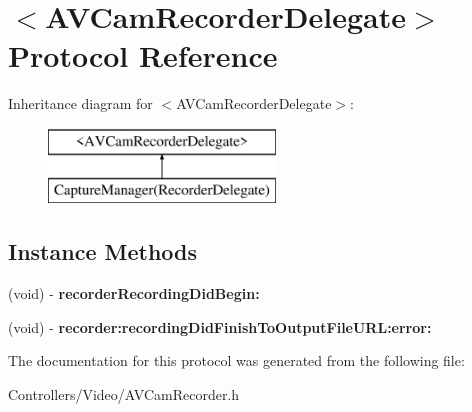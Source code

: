 \hypertarget{protocol_a_v_cam_recorder_delegate-p}{}\section{$<$A\+V\+Cam\+Recorder\+Delegate$>$ Protocol Reference}
\label{protocol_a_v_cam_recorder_delegate-p}
Inheritance diagram for $<$A\+V\+Cam\+Recorder\+Delegate$>$\+:\begin{figure}[H]
\begin{center}
\leavevmode
\includegraphics[height=2.000000cm]{protocol_a_v_cam_recorder_delegate-p}
\end{center}
\end{figure}
\subsection*{Instance Methods}
\begin{DoxyCompactItemize}
\item 
\hypertarget{protocol_a_v_cam_recorder_delegate-p_a4dd7a7e194a60637b3dfc3dce706d724}{}(void) -\/ {\bfseries recorder\+Recording\+Did\+Begin\+:}\label{protocol_a_v_cam_recorder_delegate-p_a4dd7a7e194a60637b3dfc3dce706d724}

\item 
\hypertarget{protocol_a_v_cam_recorder_delegate-p_a016913d566c24147ecd248d9db2f32e0}{}(void) -\/ {\bfseries recorder\+:recording\+Did\+Finish\+To\+Output\+File\+U\+R\+L\+:error\+:}\label{protocol_a_v_cam_recorder_delegate-p_a016913d566c24147ecd248d9db2f32e0}

\end{DoxyCompactItemize}


The documentation for this protocol was generated from the following file\+:\begin{DoxyCompactItemize}
\item 
Controllers/\+Video/A\+V\+Cam\+Recorder.\+h\end{DoxyCompactItemize}
